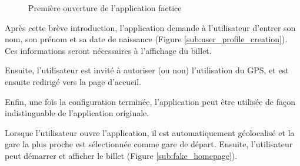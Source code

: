 \documentclass[a4paper]{article}
\begin{document}
\begin{figure}[h]
\begin{center}
{      \label{sub:intro_tuto_fairetique_disclaimer}
    }
    \caption{Première ouverture de l'application factice}
    \label{fig:fairetique_intro}
  \end{center}
\end{figure}



Après cette brève introduction, l'application demande à l'utilisateur d'entrer son nom,
son prénom et sa date de naissance (Figure \ref*{sub:user_profile_creation}).
Ces informations seront nécessaires à l'affichage du billet.

Ensuite, l'utilisateur est invité à autoriser (ou non) l'utilisation du GPS, et est
ensuite redirigé vers la page d'accueil.

Enfin, une fois la configuration terminée, l'application peut être
utilisée de façon indistinguable de l'application originale.

Lorsque l'utilisateur ouvre l'application, il est automatiquement géolocalisé
et la gare la plus proche est sélectionnée comme gare de départ. Ensuite,
l'utilisateur peut démarrer et afficher le billet (Figure \ref*{sub:fake_homepage}).
\end{document}
